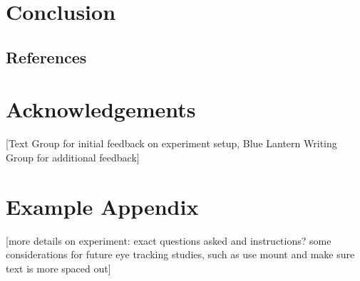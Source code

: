 \documentclass[11pt]{article}
\begin{document}
\section{Conclusion}


\subsection{References}

\nocite{Green2004,liwc_22,kuzmicova2014,brysbaert2014,chung-fat-yim_cilento_piotrowska_mar_2019,Maslej2019TheTF,boyd_blackburn_pennebaker_2020,green_brock_kaufman_2006,kasunic_kaufman_2018,Consoli2018,busselle2009,jacobs2018,jacobs2017,stockwell2002cognitive,HSU201596,willems_2015,mak2019,kunze2015,ferreira-goncalo-oliveira-2018-seeking,rashkin-etal-2016-connotation,aryani2013,delatorre2019,andrade2020,indico2015}





\section*{Acknowledgements}

[Text Group for initial feedback on experiment setup, Blue Lantern Writing Group for additional feedback]

\appendix

\section{Example Appendix}
\label{sec:appendix}

[more details on experiment: exact questions asked and instructions? some considerations for future eye tracking studies, such as use mount and make sure text is more spaced out]
\end{document}
